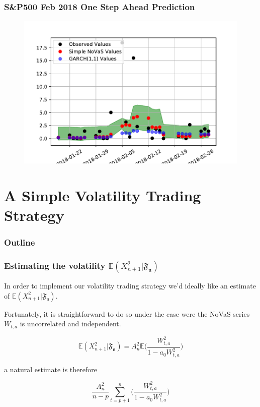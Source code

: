 \documentclass{beamer}
\begin{document}
\begin{frame}
\frametitle{S\&P500 Feb 2018 One Step Ahead Prediction}

\begin{figure}[h!]
\includegraphics[width=\textwidth]{prediction.pdf}
\end{figure}

\end{frame}

\section{A Simple Volatility Trading Strategy}

\begin{frame}
\frametitle{Outline}
\tableofcontents[currentsection]
\end{frame}

\begin{frame}
\frametitle{Estimating the volatility $\mathbb{E}(X_{n+1}^2|\mathfrak{F_n})$
}

In order to implement our volatility trading strategy we'd ideally like an estimate of $\mathbb{E}(X_{n+1}^2|\mathfrak{F_{n}})$. \\

\vspace{5pt}

Fortunately, it is straightforward to do so under the case were the NoVaS series $W_{t,a}$ is uncorrelated and independent.

$$\mathbb{E}(X_{n+1}^2|\mathfrak{F_{n}}) = A_{n}^2 \mathbb{E} \bigg( \frac{W_{t,a}^2}{1-a_0 W_{t,a}^2} \bigg) $$

a natural estimate is therefore

$$ \frac{A_{n}^2}{n-p} \sum_{t=p+1}^{n} \bigg( \frac{W_{t,a}^2}{1-a_0 W_{t,a}^2} \bigg) $$

\end{frame}
\end{document}
